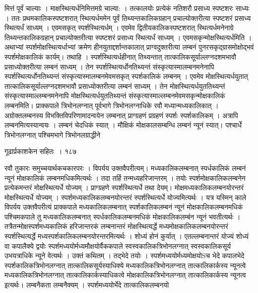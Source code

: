 \documentclass[11pt, openany]{book}
\begin{document}
\begin{sloppypar}
\noindent मित्तं पूर्वं चाल्याः । माक्षस्थित्यर्धनिमित्तमग्रे चाल्या: । तत्कालयोः प्रत्येकं नतिशरौ प्रसाध्य स्पष्टशरः साध्यः । ततः प्रथमकालिकस्पष्टशरात् स्थित्यर्धममेन पूर्वं तिथ्यन्तकालिकग्रहान् प्रचाल्योक्तरीत्या स्पष्टशरं प्रसाध्य स्थित्यर्धं साध्यम् । एवमसकृत् स्पर्शस्थित्यर्धम् । एवमेव द्वितीयकालिकस्पष्टशरात् स्थित्यर्धमनेनाग्रे तिथ्यन्तकालिकग्रहान् प्रचाल्योक्तरीत्या स्पष्टशरं प्रसाध्य स्थित्यर्धं साध्यम् । एवमसकृन्मोक्षस्थित्यर्धमिति । अथाभ्यां स्पर्शमोक्षस्थित्यर्धाभ्यां क्रमेण हीनयुताद्दर्शान्तकालात् प्राग्वदुक्तरीत्या लम्बनं पुनरसकृद्ग्रासमोक्षोद्भवं स्पर्शमोक्षकालिकं कार्यम्। तथाहि । स्पर्शस्थित्यर्धहीनात् तिथ्यन्तात् तात्कालिकसूर्याल्लग्नदशमभावौ प्रसाध्योक्तरीत्या लम्बनं साध्यम् । तेन स्पर्शस्थित्यर्धोनतिथ्यन्तं संस्कृत्यास्मालम्बनमनेनापि स्पर्शस्थित्यर्धोनतिथ्यन्तं संस्कृत्यास्मालम्बनमेवमसकृत् स्पर्शकालिकं लम्बनम् । एवमेव मोक्षस्थित्यर्धयुतात् तात्कालिकसूर्याल्लग्नदशमभावौ प्रसाध्योक्तरीत्या लम्बनं साध्यम् । तेन मोक्षस्थित्यर्धयुततिथ्यन्तं संस्कृत्यास्माल्लम्बनमनेनापि मोक्षस्थित्यर्धयुततिथ्यन्तं संस्कृत्यास्माल्लम्बनमेवमसकृन्मोक्षकालिकं लम्बनमिति। प्राक्कपाले त्रिभोनलग्नात् पूर्वभागे त्रिभोनलग्नाधिके रवौ मध्यान्मध्यकालिकात् । अग्रोक्तलम्बनस्य विभक्तिविपरिणामादन्वयेन लम्बनात् प्राग्ग्रहणं प्रग्रहणं स्पर्शः स्पर्शकालिकम् । अत्रापि लम्बनमित्यस्यान्वयः । लम्बनं चेदधिकं स्यात् । मौक्षिकं मोक्षकालसम्बन्धि लम्बनं न्यूनं स्यात्। पश्चार्धे त्रिभोनलग्नात् पश्चिमभागे त्रिभोनलग्राद्धीने
\end{sloppypar}


\newpage


 \hspace{3cm} गूढार्प्रकाशकेन सहितः~। \hfill १८७
\vspace{1cm}

\begin{sloppypar}
\noindent रवौ तुकारः समुच्चयार्थकचकारपरः । विपर्यय उक्तवैपरीत्यम्। मध्यकालिकलम्बनात् स्पर्धकालिकं लम्बनं न्यूनं मोक्षकालिकं लम्बनमधिकमित्यर्थः । तदा तर्हि तन्मध्यहरिजान्तरम् । तयोः स्पर्शमोक्षकालिकलम्बनेन प्रत्येकमन्तरं मोक्षस्थित्यर्धे योज्यम् । प्राग्ग्रहणे स्पर्शस्थित्यर्धे तथा देयम्। मोक्षमध्यकालिकलम्बनयोरन्तरं मोक्षस्थित्यर्धे योज्यम् । स्पर्शमध्यकालिकलम्बनयोरन्तरं स्पर्शस्थित्यर्धे योज्यमित्यर्थः । यत्र यस्मिन् काले विपर्यय उक्तवैपरीत्यं प्राक्कपाले मध्यकालिकलम्बनात् स्पर्शकालिकलम्बनं न्यूनं मोक्षकालिकलम्बनमधिकं पश्चिमकपाले तु मध्यकालिकलम्बनात् स्पर्धकालिकलम्बनमधिकं मोक्षकालिकलम्बंन न्यूनं भवतीत्यर्थः । तत्रैतन्मोक्षस्पर्शमध्यकालिकं हरिजान्तरकं लम्बनान्तरं मोक्षस्थित्यर्द्धे मध्यमोक्षकालिकलम्बनयोरन्तरं स्पर्शस्थित्यर्द्धे मध्यस्पर्शकालिकलम्बनयोरन्तरमित्यर्थः । शोध्यं होनं कुर्यात् । एतल्लम्बनान्तरं योज्यं शोध्यं वा कपालैक्ये द्वयोः स्पर्शमध्ययोर्मध्यमौक्षयोर्वैककपाले स्वस्वकालिकत्रिभोनलग्नात् स्वस्वकालिकसूर्य उभयत्राधिके न्यूने वेत्यर्थः । उक्तं कथितम् । तद्भेदे तयोः । स्पर्शमध्ययोर्मध्यमोक्षयोSच भेदे कपालभेदे स्पर्शकालिकत्रिभोनलग्नात् तात्कालिकसूर्यस्याधिक्ये मध्यकालिकत्रिभोनलग्नात् तात्कालिकार्कस्य न्यूनत्वे मध्यकालिकत्रिभोनलग्नात् तात्कालिकार्कस्याधिकत्वे मोक्षकालिकत्रिभोनलग्नात् तात्कालिकार्कस्य न्यूनत्व इत्यर्थः। लम्बनैकता लम्बनैक्यम् । स्पर्शमध्ययोर्भेदे तात्कालिकलम्बनयो\textendash
\end{sloppypar}
\end{document}

